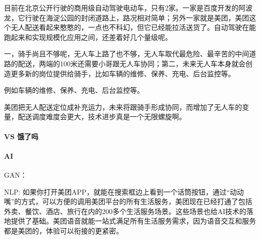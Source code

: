 \documentclass[letterpaper,11pt,english]{sphinxmanual}
\begin{document}
目前在北京公开行驶的商用级自动驾驶电动车，只有2家。一家是百度开发的阿波龙，它行驶在海淀公园的封闭道路上，路况相对简单；另外一家就是美团，美团这个无人配送看起来憨憨的，一点也不科幻，但它已经能拉活送货了。自动驾驶在能跑起来和实现规模化应用之间，还差着好几个量级呢。

一，骑手尚且不够呢，无人车上路了也不够，无人车取代最危险、最辛苦的中间道路的配送，两端的100米还需要小哥跟无人车协同；第二，未来无人车本身就会创造更多新的岗位提供给骑手，比如车辆的维修、保养、充电、后台监控等。

例如车辆的维修、保养、充电、后台监控等。

美团把无人配送定位成补充运力，未来将跟骑手形成协同，而增加了无人车的变量，配送调度难度会更大，技术进步真是一个无限螺旋啊。%
\begin{footnote}[911]\sphinxAtStartFootnote
{}
%
\end{footnote}


\paragraph{VS 饿了吗}
\label{\detokenize{chapter_company/meituan:vs}}


\paragraph{AI}
\label{\detokenize{chapter_company/meituan:ai}}

GAN：

NLP:
如果你打开美团APP，就能在搜索框边上看到一个话筒按钮，通过“动动嘴”的方式，可以方便的调用美团平台的所有生活服务，美团现在已经打通了包括外卖、餐饮、酒店、旅行在内的200多个生活服务场景。这些场景也给AI技术的落地提供了基础。美团语音就能一站式满足所有生活服务需求，因为语音交互和服务都是美团的，体验可以衔接的更紧密。%
\begin{footnote}[912]\sphinxAtStartFootnote
{}
%
\end{footnote}
\end{document}
